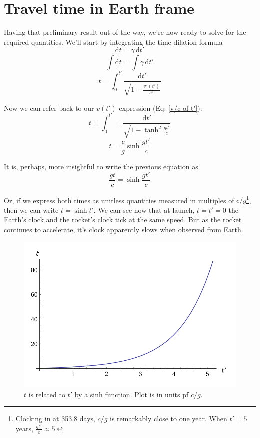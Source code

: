 \documentclass[10pt,a4paper]{article}
\begin{document}
\section{Travel time in Earth frame}
Having that preliminary result out of the way, we're now ready to solve for the required quantities.  We'll start by integrating the time dilation formula
\begin{equation}
\mathrm{d}t=\gamma \,\mathrm{d}t'
\end{equation}
\begin{equation}
\int\mathrm{d}t=\int\gamma \,\mathrm{d}t'
\end{equation}
\begin{equation} \label{time integral}
t=\int_0^{t'}\frac{\mathrm{d}t'}{\sqrt{1-\frac{v^2(t')}{c^2}}}
\end{equation}

Now we can refer back to our $v(t')$ expression (Eq: \ref{v/c of t'}).
\begin{equation}
t=\int_0^{t'}=\frac{\mathrm{d}t'}{\sqrt{1-\tanh^2\frac{gt'}{c}}}
\end{equation}
\begin{equation}\label{t of t'}\boxed{
t=\frac{c}{g}\sinh\frac{gt'}{c}
}\end{equation}

It is, perhaps, more insightful to write the previous equation as
\begin{equation}
\frac{gt}{c}=\sinh\frac{gt'}{c}
\end{equation}

Or, if we express both times as unitless quantities measured in multiples of $c/g$\footnote{Clocking in at 353.8 days, $c/g$ is remarkably close to one year. When $t'=5$ years, $\frac{gt'}{c}\approx 5$.}, then we can write $t=\sinh t'$.  We can see now that at launch, $t=t'=0$ the Earth's clock and the rocket's clock tick at the same speed.  But as the rocket continues to accelerate, it's clock apparently slows when observed from Earth.
\begin{figure}[h]
\centering
\includegraphics[scale=.4]{Jackson11-6-graph.png}
\caption{$t$ is related to $t'$ by a sinh function. Plot is in units pf $c/g$.}
\end{figure}
\end{document}
